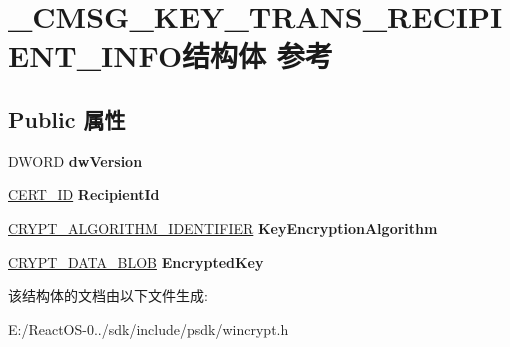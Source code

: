 \hypertarget{struct___c_m_s_g___k_e_y___t_r_a_n_s___r_e_c_i_p_i_e_n_t___i_n_f_o}{}\section{\+\_\+\+C\+M\+S\+G\+\_\+\+K\+E\+Y\+\_\+\+T\+R\+A\+N\+S\+\_\+\+R\+E\+C\+I\+P\+I\+E\+N\+T\+\_\+\+I\+N\+F\+O结构体 参考}
\label{struct___c_m_s_g___k_e_y___t_r_a_n_s___r_e_c_i_p_i_e_n_t___i_n_f_o}
\subsection*{Public 属性}
\begin{DoxyCompactItemize}
\item 
\mbox{\label{struct___c_m_s_g___k_e_y___t_r_a_n_s___r_e_c_i_p_i_e_n_t___i_n_f_o_aa8d8897a1b872ef6e26d2e7c3f9975fd}} 
D\+W\+O\+RD {\bfseries dw\+Version}
\item 
\mbox{\label{struct___c_m_s_g___k_e_y___t_r_a_n_s___r_e_c_i_p_i_e_n_t___i_n_f_o_a62d8c78641e54f52fefac4cafd9c7d17}} 
\hyperlink{struct___c_e_r_t___i_d}{C\+E\+R\+T\+\_\+\+ID} {\bfseries Recipient\+Id}
\item 
\mbox{\label{struct___c_m_s_g___k_e_y___t_r_a_n_s___r_e_c_i_p_i_e_n_t___i_n_f_o_a7de7bec14a1f6dc9a4e43e5a84a3ddd4}} 
\hyperlink{struct___c_r_y_p_t___a_l_g_o_r_i_t_h_m___i_d_e_n_t_i_f_i_e_r}{C\+R\+Y\+P\+T\+\_\+\+A\+L\+G\+O\+R\+I\+T\+H\+M\+\_\+\+I\+D\+E\+N\+T\+I\+F\+I\+ER} {\bfseries Key\+Encryption\+Algorithm}
\item 
\mbox{\label{struct___c_m_s_g___k_e_y___t_r_a_n_s___r_e_c_i_p_i_e_n_t___i_n_f_o_a9e1208673ae388037fe78d9365255546}} 
\hyperlink{struct___c_r_y_p_t_o_a_p_i___b_l_o_b}{C\+R\+Y\+P\+T\+\_\+\+D\+A\+T\+A\+\_\+\+B\+L\+OB} {\bfseries Encrypted\+Key}
\end{DoxyCompactItemize}


该结构体的文档由以下文件生成\+:\begin{DoxyCompactItemize}
\item 
E\+:/\+React\+O\+S-\/0../sdk/include/psdk/wincrypt.\+h\end{DoxyCompactItemize}
